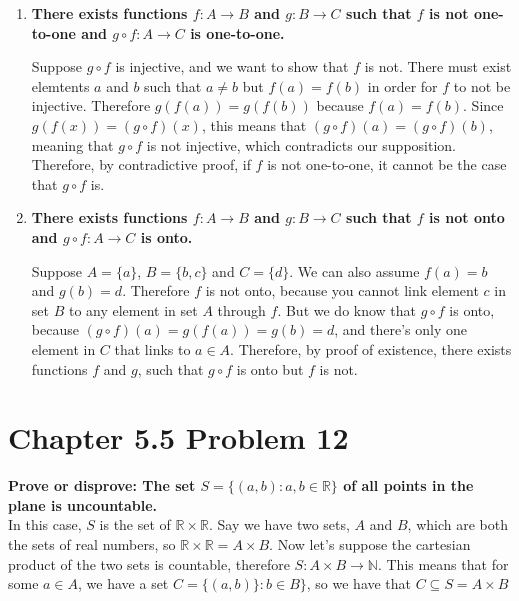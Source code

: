 \documentclass[10pt]{article}
\begin{document}
\begin{enumerate}[label=(\alph*)]

    \item \textbf{There exists functions $f: A \to B$ and $g: B \to C$ such that $f$ is not one-to-one and $g \circ f: A \to C$
        is one-to-one.}

        Suppose $g \circ f$ is injective, and we want to show that $f$ is not.  There must exist elemtents $a$ and $b$ such that $a \not= b$ but 
        $f(a) = f(b)$ in order for $f$ to not be injective.  Therefore $g(f(a)) = g(f(b))$ because $f(a) = f(b)$.  Since $g(f(x)) = (g \circ f)(x)$, 
        this means that $(g \circ f)(a) = (g \circ f)(b)$, meaning that $g \circ f$ is not injective, which contradicts our supposition.  Therefore, 
        by contradictive proof, if $f$ is not one-to-one, it cannot be the case that $g \circ f$ is.

    \item \textbf{There exists functions $f: A \to B$ and $g: B \to C$ such that $f$ is not onto and $g \circ f: A \to C$ is onto.}

        Suppose $A = \{a\}$, $B = \{b,c\}$ and $C = \{d\}$.  We can also assume $f(a) = b$ and $g(b) = d$.  Therefore $f$ is not onto, because you cannot
        link element $c$ in set $B$ to any element in set $A$ through $f$.  But we do know that $g \circ f$ is onto, because $(g \circ f)(a) = g(f(a)) = g(b) = d$,
        and there's only one element in $C$ that links to $a \in A$.  Therefore, by proof of existence, there exists functions $f$ and $g$, such that 
        $g \circ f$ is onto but $f$ is not.

\end{enumerate}



\section{Chapter 5.5 Problem 12}
\textbf{Prove or disprove: The set $S = \{(a,b): a,b \in \mathbb{R}\}$ of all points in the plane is uncountable.} \\

In this case, $S$ is the set of $\mathbb{R} \times \mathbb{R}$.  Say we have two sets, $A$ and $B$, which are both the sets of real numbers, so 
$\mathbb{R} \times \mathbb{R} = A \times B$.  Now let's suppose the cartesian product of the two sets is countable, therefore
$S: A \times B \to \mathbb{N}$.  This means that for some $a \in A$, we have a set $C = \{(a,b)\}: b \in B\}$, so we have that $C \subseteq S = A \times B$
\end{document}
